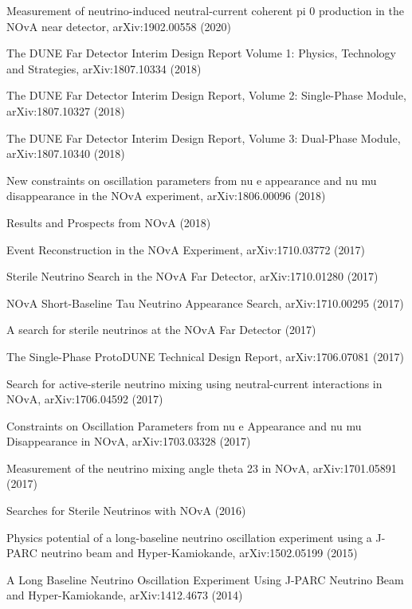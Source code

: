 \begin{list2}
\item Measurement of neutrino-induced neutral-current coherent pi 0 production in the NOvA near detector, arXiv:1902.00558 (2020) %
\item The DUNE Far Detector Interim Design Report Volume 1: Physics, Technology and Strategies, arXiv:1807.10334 (2018) %
\item The DUNE Far Detector Interim Design Report, Volume 2: Single-Phase Module, arXiv:1807.10327 (2018) %
\item The DUNE Far Detector Interim Design Report, Volume 3: Dual-Phase Module, arXiv:1807.10340 (2018) %
\item New constraints on oscillation parameters from nu e appearance and nu mu disappearance in the NOvA experiment, arXiv:1806.00096 (2018) %
\item Results and Prospects from NOvA (2018) %
\item Event Reconstruction in the NOvA Experiment, arXiv:1710.03772 (2017) %
\item Sterile Neutrino Search in the NOvA Far Detector, arXiv:1710.01280 (2017) %
\item NOvA Short-Baseline Tau Neutrino Appearance Search, arXiv:1710.00295 (2017) %
\item A search for sterile neutrinos at the NOvA Far Detector (2017) %
\item The Single-Phase ProtoDUNE Technical Design Report, arXiv:1706.07081 (2017) %
\item Search for active-sterile neutrino mixing using neutral-current interactions in NOvA, arXiv:1706.04592 (2017) %
\item Constraints on Oscillation Parameters from nu e Appearance and nu mu Disappearance in NOvA, arXiv:1703.03328 (2017) %
\item Measurement of the neutrino mixing angle theta 23 in NOvA, arXiv:1701.05891 (2017) %
\item Searches for Sterile Neutrinos with NOvA (2016) %
\item Physics potential of a long-baseline neutrino oscillation experiment using a J-PARC neutrino beam and Hyper-Kamiokande, arXiv:1502.05199 (2015) %
\item A Long Baseline Neutrino Oscillation Experiment Using J-PARC Neutrino Beam and Hyper-Kamiokande, arXiv:1412.4673 (2014) %

\end{list2}
